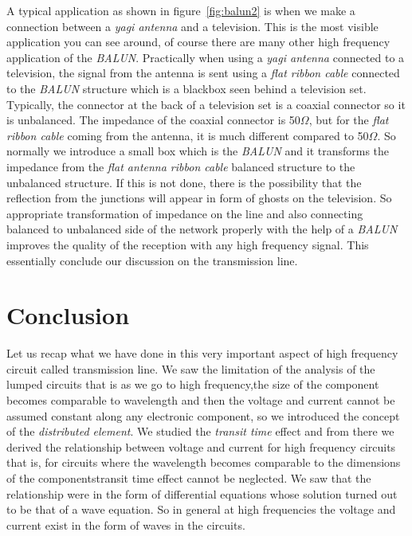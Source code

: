 A typical application as shown in figure~\ref{fig:balun2} is when we make a connection between a \emph{yagi antenna} and a television. This is the most visible application you can see around, of course there are many other high frequency application of the \emph{BALUN}. Practically when using a \emph{yagi antenna} connected to a television, the signal from the antenna is sent using a \emph{flat ribbon cable} connected to the \emph{BALUN} structure which is a blackbox seen behind a television set. Typically, the connector at the back of a television set is a coaxial connector so it is unbalanced. The impedance of the coaxial connector is 50$\varOmega$, but for the \emph{flat ribbon cable} coming from the antenna, it is much different compared to 50$\varOmega$. So normally we introduce a small box which is the \emph{BALUN} and it transforms the impedance from the \emph{flat antenna ribbon cable} balanced structure to the unbalanced structure. If this is not done, there is the possibility that the reflection from the junctions will appear in form of ghosts on the television. So appropriate transformation of impedance on the line and also connecting balanced to unbalanced side of the network properly with the help of a \emph{BALUN} improves the quality of the reception with any high frequency signal. This essentially conclude our discussion on the transmission line.

\section{Conclusion}
Let us recap what we have done in this very important aspect of high frequency circuit called transmission line. We saw the limitation of the analysis of the lumped circuits that is as we go to high frequency,the size of the component becomes comparable to wavelength and then the voltage and current cannot be assumed constant along any electronic component, so we introduced the concept of the \emph{distributed element}. We studied the \emph{transit time} effect and from there we derived the relationship between voltage and current for high frequency circuits that is, for circuits where the wavelength becomes comparable to the dimensions of the components\textemdash\;transit time effect cannot be neglected. We saw that the relationship were in the form of differential equations whose solution turned out to be that of a wave equation. So in general at high frequencies the voltage and current exist in the form of waves in the circuits.

